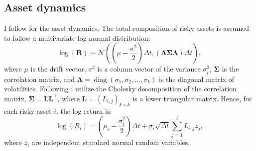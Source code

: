 \documentclass[11pt]{article}
\begin{document}
\subsection{Asset dynamics} \label{Subsection: Asset-dynamics}
I follow \textcite{CaiJuddXu2013} for the asset dynamics. The total composition of risky assets is assumed
to follow a multivariate log-normal distribution:
\begin{equation}\label{eq:Multivariate_Distribution}
   \log (\mathbf{R}) \sim \mathcal{N} \left( \left( \mu - \frac{\sigma^{2}}{2} \right) \Delta t , \left( \boldsymbol{\Lambda \Sigma \Lambda } \right) \Delta t \right),
\end{equation}
where \(\mu\) is the drift vector, \(\sigma^{2}\) is a column vector of the variance $\sigma^{2}_{i}$, \(\boldsymbol{\Sigma}\) is
the correlation matrix, and \(\boldsymbol{\Lambda} = \operatorname{diag}(\sigma_1 , \sigma_2 , \ldots , \sigma_k)\)
is the diagonal matrix of volatilities. Following \textcite{CaiJuddXu2013} i utilize the Cholesky decomposition of the correlation matrix,
\(\boldsymbol{\Sigma} = \mathbf{L} \mathbf{L}^\top\), where \(\mathbf{L} = (L_{i,j})_{k \times k}\) is a
lower triangular matrix. Hence, for each risky asset \(i\), the log-return is:
\begin{equation}\label{eq:Distribution_Single_Return}
  \log (R_i) = \left( \mu_i - \frac{\sigma_i^2}{2} \right) \Delta t + \sigma_i \sqrt{\Delta t} \sum_{j=1}^i L_{i,j} z_j,
\end{equation}
where \(z_i\) are independent standard normal random variables.
\end{document}
